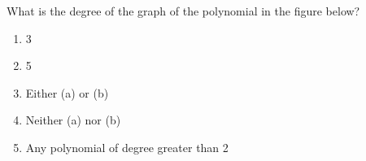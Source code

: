 \bigskip

\item What is the degree of the graph of the polynomial in the figure below?


    \begin{minipage}{0.4\columnwidth}
        \begin{enumerate}
            \item 3
            \item 5
            \item Either (a) or (b)
            \item Neither (a) nor (b)
            \item Any polynomial of degree greater than 2
        \end{enumerate}
    \end{minipage}
    \begin{minipage}{0.6\columnwidth}
    \end{minipage}

